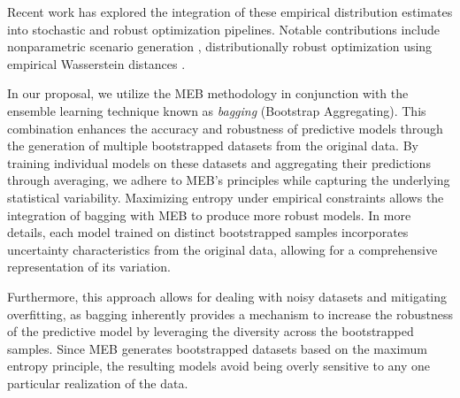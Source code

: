 \documentclass[11pt]{article}
\begin{document}
Recent work has explored the integration of these empirical distribution estimates into stochastic and robust optimization pipelines. Notable contributions include nonparametric scenario generation \citep{BM11}, distributionally robust optimization using empirical Wasserstein distances \citep{EK17}. 

In our proposal, we utilize the MEB methodology in conjunction with the ensemble learning technique known as {\it bagging} (Bootstrap Aggregating). This combination enhances the accuracy and robustness of predictive models through the generation of multiple bootstrapped datasets from the original data. By training individual models on these datasets and aggregating their predictions through averaging, we adhere to MEB's principles while capturing the underlying statistical variability. Maximizing entropy under empirical constraints allows the integration of bagging with MEB to produce more robust models. In more details, each model trained on distinct bootstrapped samples incorporates uncertainty characteristics from the original data, allowing for a comprehensive representation of its variation.

Furthermore, this approach allows for dealing with noisy datasets and mitigating overfitting, as bagging inherently provides a mechanism to increase the robustness of the predictive model by leveraging the diversity across the bootstrapped samples. Since MEB generates bootstrapped datasets based on the maximum entropy principle, the resulting models avoid being overly sensitive to any one particular realization of the data.

\end{document}
